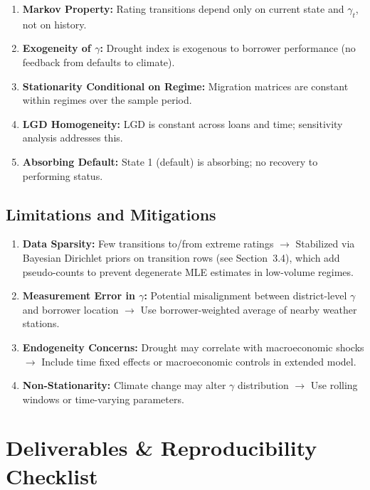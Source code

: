 \documentclass[12pt,a4paper]{article}
\begin{document}
\begin{enumerate}[noitemsep]
    \item \textbf{Markov Property:} Rating transitions depend only on current state and $\gamma_t$, not on history.
    \item \textbf{Exogeneity of $\gamma$:} Drought index is exogenous to borrower performance (no feedback from defaults to climate).
    \item \textbf{Stationarity Conditional on Regime:} Migration matrices are constant within regimes over the sample period.
    \item \textbf{LGD Homogeneity:} LGD is constant across loans and time; sensitivity analysis addresses this.
    \item \textbf{Absorbing Default:} State 1 (default) is absorbing; no recovery to performing status.
\end{enumerate}

\subsection{Limitations and Mitigations}

\begin{enumerate}[noitemsep]
    \item \textbf{Data Sparsity:} Few transitions to/from extreme ratings $\to$ Stabilized via Bayesian Dirichlet priors on transition rows (see Section~3.4), which add pseudo-counts to prevent degenerate MLE estimates in low-volume regimes.
    \item \textbf{Measurement Error in $\gamma$:} Potential misalignment between district-level $\gamma$ and borrower location $\to$ Use borrower-weighted average of nearby weather stations.
    \item \textbf{Endogeneity Concerns:} Drought may correlate with macroeconomic shocks $\to$ Include time fixed effects or macroeconomic controls in extended model.
    \item \textbf{Non-Stationarity:} Climate change may alter $\gamma$ distribution $\to$ Use rolling windows or time-varying parameters.
\end{enumerate}

\section{Deliverables \& Reproducibility Checklist}
\end{document}
